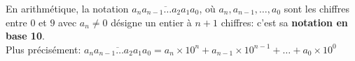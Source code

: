 
En arithmétique, la notation $\overline{a_na_{n-1}\ldots{}a_2a_1a_0}$, où $a_n,a_{n-1},\ldots{},a_0$ sont les chiffres entre $0$ et $9$ avec $a_n\not=0$ désigne un entier à $n+1$ chiffres: c'est sa \textbf{notation en base 10}.\\
Plus précisément: $\overline{a_na_{n-1}\ldots{}a_2a_1a_0}=a_n\times10^{n}+a_{n-1}\times10^{n-1}+\ldots{}+a_0\times10^{0}$
